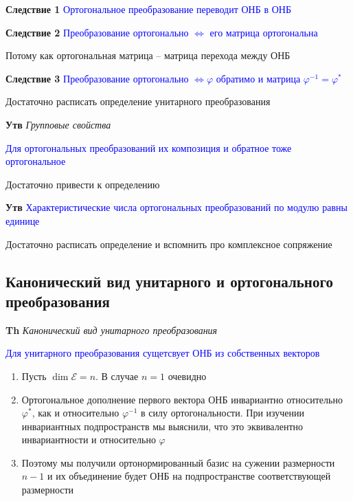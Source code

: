 \documentclass[a4paper, 14pt]{article}
\begin{document}
    \textbf{Следствие 1} \textcolor{blue}{Ортогональное преобразование переводит ОНБ в ОНБ}
    
    \textbf{Следствие 2} \textcolor{blue}{Преобразование ортогонально $\Leftrightarrow$ его матрица ортогональна}
    
    Потому как ортогональная матрица -- матрица перехода между ОНБ
    
    \textbf{Следствие 3} \textcolor{blue}{Преобразование ортогонально $\Leftrightarrow \varphi$ обратимо и
    матрица $\varphi^{-1} = \varphi^*$}
    
    Достаточно расписать определение унитарного преобразования
    
    \textbf{Утв} \textit{Групповые свойства}
    
    \textcolor{blue}{Для ортогональных преобразований их композиция и обратное тоже ортогональное}
    
    Достаточно привести к определению
    
    \textbf{Утв} \textcolor{blue}{Характеристические числа ортогональных преобразований по модулю равны единице}
    
    Достаточно расписать определение и вспомнить про комплексное сопряжение
    
    \subsection{Канонический вид унитарного и ортогонального преобразования}
    
    \textbf{Th} \textit{Канонический вид унитарного преобразования}
    
    \textcolor{blue}{Для унитарного преобразования сущетсвует ОНБ из собственных векторов}
    
    \begin{enumerate}
        \item Пусть $\dim \mathscr{E} = n$.
        В случае $n = 1$ очевидно
        \item Ортогональное дополнение первого вектора ОНБ инвариантно относительно $\varphi^*$, как и относительно $\varphi^{-1}$ в
        силу ортогональности.
        При изучении инвариантных подпространств мы выяснили, что это эквивалентно инвариантности и относительно $\varphi$
        \item Поэтому мы получили ортонормированный базис на сужении размерности $n - 1$ и их объединение будет ОНБ на
        подпространстве соответствующей размерности
    \end{enumerate}
    
\end{document}
